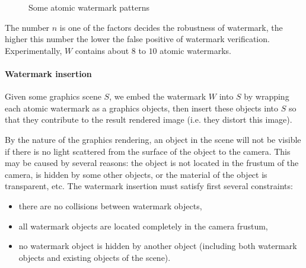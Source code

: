 \documentclass[a4paper,11pt,onecolumn]{memoir}
\begin{document}
\begin{figure}[h]
\begin{subfigure}[b]{0.25\textwidth}
    \end{subfigure}
    \caption[Some atomic watermark patterns]{Some atomic watermark patterns}
    \label{fig:atomic_patterns}
\end{figure}
The number $n$ is one of the factors decides the robustness of watermark, the higher this number the lower the false positive of watermark verification. Experimentally, $W$ contains about $8$ to $10$ atomic watermarks.

\paragraph[Watermark insertion]{Watermark insertion}
Given some graphics scene $S$, we embed the watermark $W$ into $S$ by wrapping each atomic watermark as a graphics objects, then insert these objects into $S$ so that they contribute to the result rendered image (i.e. they distort this image).

By the nature of the graphics rendering, an object in the scene will not be visible if there is no light scattered from the surface of the object to the camera. This may be caused by several reasons: the object is not located in the frustum of the camera, is hidden by some other objects, or the material of the object is transparent, etc. The watermark insertion must satisfy first several constraints:
\begin{itemize}
    \item there are no collisions between watermark objects,
    \item all watermark objects are located completely in the camera frustum,
    \item no watermark object is hidden by another object (including both watermark objects and existing objects of the scene).
\end{itemize}
\end{document}
